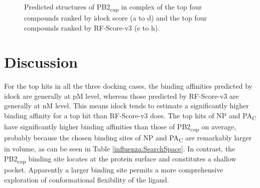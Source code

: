 \begin{figure}
\centering
{}
\\
\\
\\
\caption{Predicted structures of PB2\textsubscript{cap} in complex of the top four compounds ranked by idock score (a to d) and the top four compounds ranked by RF-Score-v3 (e to h).}
\label{influenza:2VQZ-Hits-4}
\end{figure}

\section{Discussion}

For the top hits in all the three docking cases, the binding affinities predicted by idock are generally at pM level, whereas those predicted by RF-Score-v3 are generally at nM level. This means idock tends to estimate a significantly higher binding affinity for a top hit than RF-Score-v3 does. The top hits of NP and PA\textsubscript{C} have significantly higher binding affinities than those of PB2\textsubscript{cap} on average, probably because the chosen binding sites of NP and PA\textsubscript{C} are remarkably larger in volume, as can be seen in Table \ref{influenza:SearchSpace}. In contrast, the PB2\textsubscript{cap} binding site locates at the protein surface and constitutes a shallow pocket. Apparently a larger binding site permits a more comprehensive exploration of conformational flexibility of the ligand.

